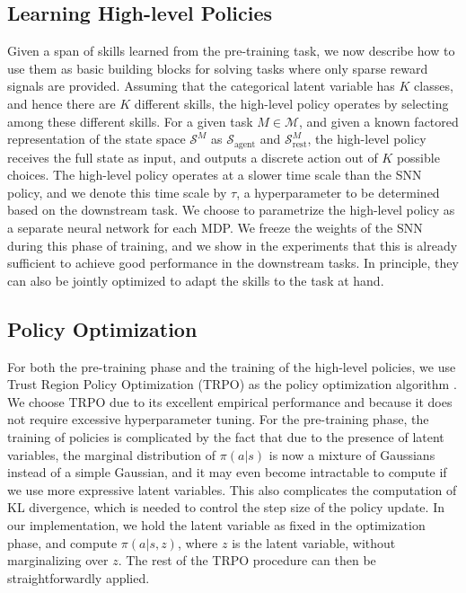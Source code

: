 \documentclass{article} %
\newcommand{\sset}{\mathcal{S}}
\newcommand{\mdpset}{\mathcal{M}}
\newcommand{\agent}{\mathrm{agent}}
\begin{document}
\subsection{Learning High-level Policies}
\label{section:method:highlevel}

Given a span of skills learned from the pre-training task, we now describe how to use them as basic building blocks for solving tasks where only sparse reward signals are provided. Assuming that the categorical latent variable has $K$ classes, and hence there are $K$ different skills, the high-level policy operates by selecting among these different skills. For a given task $M \in \mdpset$, and given a known factored representation of the state space $\sset^M$ as $\sset_\agent$ and $\sset_{\mathrm{rest}}^M$, the high-level policy receives the full state as input, and outputs a discrete action out of $K$ possible choices. The high-level policy operates at a slower time scale than the SNN policy, and we denote this time scale by $\tau$, a hyperparameter to be determined based on the downstream task. We choose to parametrize the high-level policy as a separate neural network for each MDP. We freeze the weights of the SNN during this phase of training, and we show in the experiments that this is already sufficient to achieve good performance in the downstream tasks. In principle, they can also be jointly optimized to adapt the skills to the task at hand. %

\subsection{Policy Optimization}
\label{section:method:polopt}

For both the pre-training phase and the training of the high-level policies, we use Trust Region Policy Optimization (TRPO) as the policy optimization algorithm \citep{Schulman15TRPO}. We choose TRPO due to its excellent empirical performance and because it does not require excessive hyperparameter tuning. For the pre-training phase, the training of policies is complicated by the fact that due to the presence of latent variables, the marginal distribution of $\pi(a|s)$ is now a mixture of Gaussians instead of a simple Gaussian, and it may even become intractable to compute if we use more expressive latent variables. This also complicates the computation of KL divergence, which is needed to control the step size of the policy update. In our implementation, we hold the latent variable as fixed in the optimization phase, and compute $\pi(a|s,z)$, where $z$ is the latent variable, without marginalizing over $z$. The rest of the TRPO procedure can then be straightforwardly applied. %
\end{document}
